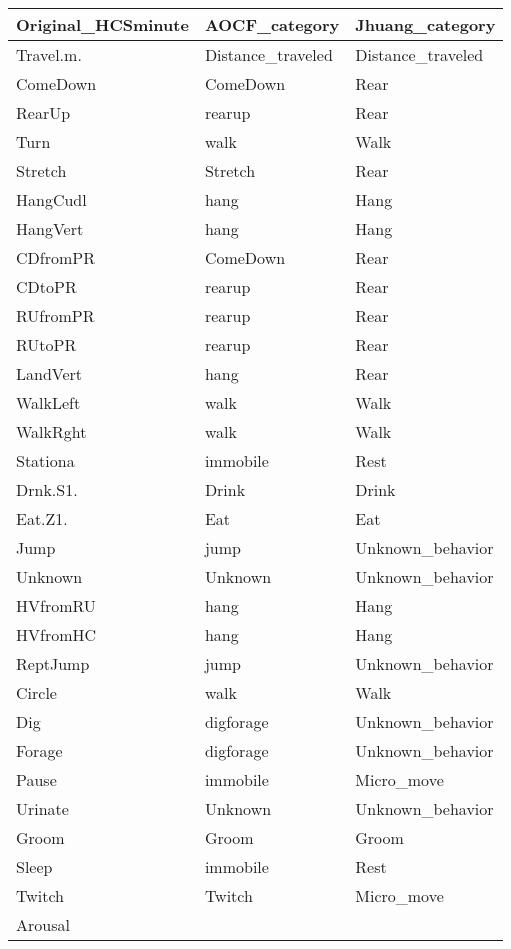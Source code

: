 \begin{table}[!htbp]
\centering
\begin{tabular}{|l|l|l|}
  \hline
Original\_HCSminute & AOCF\_category & Jhuang\_category \\ 
  \hline
Travel.m. & Distance\_traveled & Distance\_traveled \\ 
  ComeDown & ComeDown & Rear \\ 
  RearUp & rearup & Rear \\ 
  Turn & walk & Walk \\ 
  Stretch & Stretch & Rear \\ 
  HangCudl & hang & Hang \\ 
  HangVert & hang & Hang \\ 
  CDfromPR & ComeDown & Rear \\ 
  CDtoPR & rearup & Rear \\ 
  RUfromPR & rearup & Rear \\ 
  RUtoPR & rearup & Rear \\ 
  LandVert & hang & Rear \\ 
  WalkLeft & walk & Walk \\ 
  WalkRght & walk & Walk \\ 
  Stationa & immobile & Rest \\ 
  Drnk.S1. & Drink & Drink \\ 
  Eat.Z1. & Eat & Eat \\ 
  Jump & jump & Unknown\_behavior \\ 
  Unknown & Unknown & Unknown\_behavior \\ 
  HVfromRU & hang & Hang \\ 
  HVfromHC & hang & Hang \\ 
  ReptJump & jump & Unknown\_behavior \\ 
  Circle & walk & Walk \\ 
  Dig & digforage & Unknown\_behavior \\ 
  Forage & digforage & Unknown\_behavior \\ 
  Pause & immobile & Micro\_move \\ 
  Urinate & Unknown & Unknown\_behavior \\ 
  Groom & Groom & Groom \\ 
  Sleep & immobile & Rest \\ 
  Twitch & Twitch & Micro\_move \\ 
  Arousal &  &  \\ 

\end{tabular}
\end{table}
